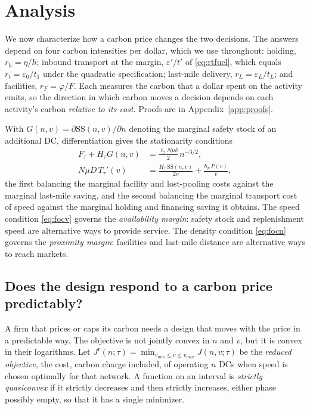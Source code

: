 \documentclass[11pt]{article}
\numberwithin{proposition}{section}
\theoremstyle{definition}
\theoremstyle{remark}
\theoremstyle{plain}
\newcommand{\sstock}{\mathrm{SS}}
\begin{document}
\section{Analysis}\label{sec:analysis}

We now characterize how a carbon price changes the two decisions. The answers depend on four
carbon intensities per dollar, which we use throughout: holding, $r_h=\eta/h$; inbound transport at the margin,
$\varepsilon'/t'$ of \eqref{eq:rtfuel}, which equals $r_t=\varepsilon_0/t_1$ under the quadratic specification;
last-mile delivery, $r_L=\varepsilon_L/t_L$; and facilities, $r_F=\varphi/F$. Each measures the carbon that a
dollar spent on the activity emits, so the direction in which carbon moves a decision depends on each activity's
carbon \emph{relative to its cost}. Proofs are in Appendix~\ref{app:proofs}.

With $G(n,v)=\partial\sstock(n,v)/\partial n$ denoting the marginal safety stock of an additional DC,
differentiation gives the stationarity conditions
\begin{align}
  F_\tau + H_\tau G(n,v) &= \frac{\ell_\tau N\mu\delta}{2}\,n^{-3/2}, \label{eq:focn}\\[2pt]
  N\mu D\,T_\tau'(v) &= \frac{H_\tau\,\sstock(n,v)}{2v}+\frac{h_p\,P(v)}{v}, \label{eq:focv}
\end{align}
the first balancing the marginal facility and lost-pooling costs against the marginal last-mile saving, and
the second balancing the marginal transport cost of speed against the marginal holding and financing saving it
obtains. The speed condition \eqref{eq:focv} governs the \emph{availability margin}: safety stock and
replenishment speed are alternative ways to provide service. The density condition \eqref{eq:focn} governs the
\emph{proximity margin}: facilities and last-mile distance are alternative ways to reach markets.

\subsection{Does the design respond to a carbon price predictably?}\label{sec:unique}

A firm that prices or caps its carbon needs a design that moves with the price in a predictable way. The
objective is not jointly convex in $n$ and $v$, but it is convex in their logarithms. Let
$J^{\mathrm r}(n;\tau)=\min_{v_{\min}\le v\le v_{\max}}J(n,v;\tau)$ be the \emph{reduced objective}, the cost,
carbon charge included, of operating $n$ DCs when speed is chosen optimally for that network. A
function on an interval is \emph{strictly quasiconvex} if it strictly decreases and then strictly increases,
either phase possibly empty, so that it has a single minimizer.
\end{document}
